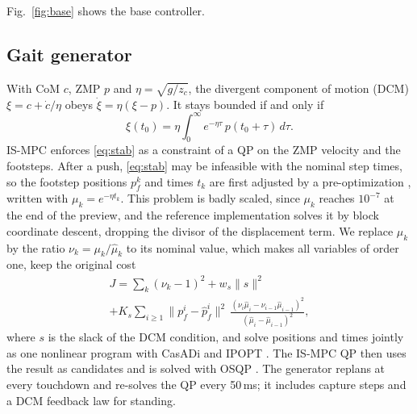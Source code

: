 \documentclass[conference]{IEEEtran}
\begin{document}
Fig.~\ref{fig:base} shows the base controller.

\subsection{Gait generator}
With CoM $c$, ZMP $p$ and $\eta=\sqrt{g/z_c}$, the divergent component of motion (DCM) $\xi=c+\dot c/\eta$ obeys $\dot\xi=\eta(\xi-p)$.
It stays bounded if and only if \cite{lanari2014boundedness}
\begin{equation}
\xi(t_0)=\eta\int_{0}^{\infty}e^{-\eta\tau}\,p(t_0+\tau)\,d\tau .
\label{eq:stab}
\end{equation}
IS-MPC \cite{scianca2020ismpc} enforces \eqref{eq:stab} as a constraint of a QP on the ZMP velocity and the footsteps.
After a push, \eqref{eq:stab} may be infeasible with the nominal step times, so the footstep positions $p_f^k$ and times $t_k$ are first adjusted by a pre-optimization \cite{dallard2025adios}, written with $\mu_k=e^{-\eta t_k}$.
This problem is badly scaled, since $\mu_k$ reaches $10^{-7}$ at the end of the preview, and the reference implementation \cite{ismpcwalking} solves it by block coordinate descent, dropping the divisor of the displacement term.
We replace $\mu_k$ by the ratio $\nu_k=\mu_k/\hat\mu_k$ to its nominal value, which makes all variables of order one, keep the original cost
\begin{multline}
J=\sum_k(\nu_k-1)^2+w_s\|s\|^2\\
+K_s\sum_{i\ge1}\big\|p_f^i-\hat p_f^i\big\|^2\,
\frac{(\nu_i\hat\mu_i-\nu_{i-1}\hat\mu_{i-1})^2}{(\hat\mu_i-\hat\mu_{i-1})^2},
\label{eq:cost}
\end{multline}
where $s$ is the slack of the DCM condition, and solve positions and times jointly as one nonlinear program with CasADi \cite{andersson2019casadi} and IPOPT \cite{wachter2006ipopt}.
The IS-MPC QP then uses the result as candidates and is solved with OSQP \cite{stellato2020osqp}.
The generator replans at every touchdown and re-solves the QP every 50\,ms; it includes capture steps and a DCM feedback law for standing.
\end{document}
